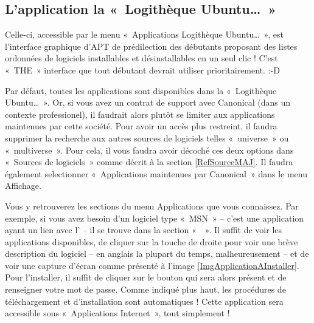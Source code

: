 {\subsection{L'application la «~Logithèque Ubuntu\dots{}~»}
Celle-ci, accessible par le menu «~Applications \FlecheDroite Logithèque Ubuntu\dots{}~», est l'interface graphique d'APT de prédilection des débutants proposant des listes ordonnées de logiciels installables et désinstallables en un seul clic ! C'est «~THE~» interface que tout débutant devrait utiliser prioritairement. :-D
\begin{nota}
Par défaut, toutes les applications sont disponibles dans la «~Logithèque Ubuntu\dots{}~». Or, si vous avez un contrat de support avec Canonical (dans un contexte professionel), il faudrait alors plutôt se limiter aux applications maintenues par cette société. Pour avoir un accès plus restreint, il faudra supprimer la recherche aux autres sources de logiciels telles «~universe~» ou «~multiverse~». Pour cela, il vous faudra avoir décoché ces deux options dans «~Sources de logiciels~» comme décrit à la section \ref{RefSourceMAJ}. Il faudra également selectionner «~Applications maintenues par Canonical~» dans le menu Affichage.
\end{nota}
Vous y retrouverez les sections du menu Applications que vous connaissez. Par exemple, si vous avez besoin d'un logiciel type «~MSN~» -- c'est une application ayant un lien avec l' -- il se trouve dans la section «~~». Il suffit de voir les applications disponibles, de cliquer sur la touche de droite pour voir une brève description du logiciel -- en anglais la plupart du temps, malheureusement -- et de voir une capture d'écran comme présenté à l'image \ref{ImgApplicationAInstaller}. Pour l'installer, il suffit de cliquer sur le bouton qui sera alors présent et de renseigner votre mot de passe. Comme indiqué plus haut, les procédures de téléchargement et d'installation sont automatiques ! Cette application sera accessible sous «~Applications \FlecheDroite Internet~», tout simplement !\\
}

